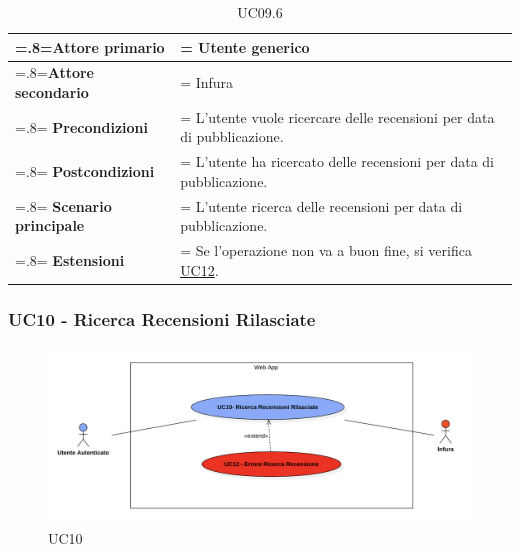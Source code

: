             \begin{table}[H]
                \centering
                \renewcommand{\arraystretch}{1.8}
                \renewcommand\tabularxcolumn[1]{m{#1}}
                \begin{tabularx}{0.9\textwidth} {
                    >{\hsize=.8\hsize\linewidth=\hsize}X
                    >{\hsize=1.2\hsize\linewidth=\hsize}X}
                    \hline
                    \textbf{Attore primario} & Utente generico \\
                    \hline
                    \textbf{Attore secondario} & Infura \\
                    \hline
                    \textbf{Precondizioni} & L'utente vuole ricercare delle recensioni per data di pubblicazione. \\
                    \hline
                    \textbf{Postcondizioni} & L'utente ha ricercato delle recensioni per data di pubblicazione. \\
                    \hline
                    \textbf{Scenario principale} & L'utente ricerca delle recensioni per data di pubblicazione.\\
                    \hline
                    \textbf{Estensioni} & Se l'operazione non va a buon fine, si verifica \hyperref[UC12]{UC12}. \\
                    \hline
                \end{tabularx}
                \caption{UC09.6}
            \end{table}

        \subsubsection{UC10 - Ricerca Recensioni Rilasciate}
        \label{UC10}

            \begin{figure}[H]
                \centering
                \includegraphics[scale=0.6]{src/img/UC10.png}
                \caption{UC10}
            \end{figure}

